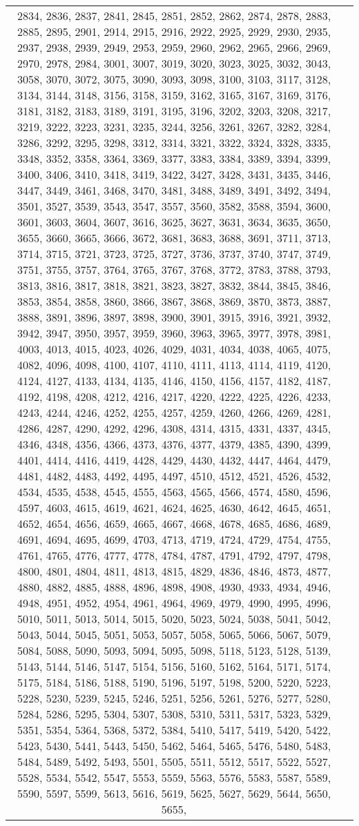 \documentclass[12pt]{article}
\begin{document}
\begin{tabular}{|c|p{15cm}|}
2834, 2836, 2837, 2841, 2845, 2851, 2852, 2862, 2874, 2878, 2883, 2885, 2895, 2901, 2914, 2915, 2916, 2922, 2925, 2929, 2930, 2935, 2937, 2938, 2939, 2949, 2953, 2959, 2960, 2962, 2965, 2966, 2969, 2970, 2978, 2984, 3001, 3007, 3019, 3020, 3023, 3025, 3032, 3043, 3058, 3070, 3072, 3075, 3090, 3093, 3098, 3100, 3103, 3117, 3128, 3134, 3144, 3148, 3156, 3158, 3159, 3162, 3165, 3167, 3169, 3176, 3181, 3182, 3183, 3189, 3191, 3195, 3196, 3202, 3203, 3208, 3217, 3219, 3222, 3223, 3231, 3235, 3244, 3256, 3261, 3267, 3282, 3284, 3286, 3292, 3295, 3298, 3312, 3314, 3321, 3322, 3324, 3328, 3335, 3348, 3352, 3358, 3364, 3369, 3377, 3383, 3384, 3389, 3394, 3399, 3400, 3406, 3410, 3418, 3419, 3422, 3427, 3428, 3431, 3435, 3446, 3447, 3449, 3461, 3468, 3470, 3481, 3488, 3489, 3491, 3492, 3494, 3501, 3527, 3539, 3543, 3547, 3557, 3560, 3582, 3588, 3594, 3600, 3601, 3603, 3604, 3607, 3616, 3625, 3627, 3631, 3634, 3635, 3650, 3655, 3660, 3665, 3666, 3672, 3681, 3683, 3688, 3691, 3711, 3713, 3714, 3715, 3721, 3723, 3725, 3727, 3736, 3737, 3740, 3747, 3749, 3751, 3755, 3757, 3764, 3765, 3767, 3768, 3772, 3783, 3788, 3793, 3813, 3816, 3817, 3818, 3821, 3823, 3827, 3832, 3844, 3845, 3846, 3853, 3854, 3858, 3860, 3866, 3867, 3868, 3869, 3870, 3873, 3887, 3888, 3891, 3896, 3897, 3898, 3900, 3901, 3915, 3916, 3921, 3932, 3942, 3947, 3950, 3957, 3959, 3960, 3963, 3965, 3977, 3978, 3981, 4003, 4013, 4015, 4023, 4026, 4029, 4031, 4034, 4038, 4065, 4075, 4082, 4096, 4098, 4100, 4107, 4110, 4111, 4113, 4114, 4119, 4120, 4124, 4127, 4133, 4134, 4135, 4146, 4150, 4156, 4157, 4182, 4187, 4192, 4198, 4208, 4212, 4216, 4217, 4220, 4222, 4225, 4226, 4233, 4243, 4244, 4246, 4252, 4255, 4257, 4259, 4260, 4266, 4269, 4281, 4286, 4287, 4290, 4292, 4296, 4308, 4314, 4315, 4331, 4337, 4345, 4346, 4348, 4356, 4366, 4373, 4376, 4377, 4379, 4385, 4390, 4399, 4401, 4414, 4416, 4419, 4428, 4429, 4430, 4432, 4447, 4464, 4479, 4481, 4482, 4483, 4492, 4495, 4497, 4510, 4512, 4521, 4526, 4532, 4534, 4535, 4538, 4545, 4555, 4563, 4565, 4566, 4574, 4580, 4596, 4597, 4603, 4615, 4619, 4621, 4624, 4625, 4630, 4642, 4645, 4651, 4652, 4654, 4656, 4659, 4665, 4667, 4668, 4678, 4685, 4686, 4689, 4691, 4694, 4695, 4699, 4703, 4713, 4719, 4724, 4729, 4754, 4755, 4761, 4765, 4776, 4777, 4778, 4784, 4787, 4791, 4792, 4797, 4798, 4800, 4801, 4804, 4811, 4813, 4815, 4829, 4836, 4846, 4873, 4877, 4880, 4882, 4885, 4888, 4896, 4898, 4908, 4930, 4933, 4934, 4946, 4948, 4951, 4952, 4954, 4961, 4964, 4969, 4979, 4990, 4995, 4996, 5010, 5011, 5013, 5014, 5015, 5020, 5023, 5024, 5038, 5041, 5042, 5043, 5044, 5045, 5051, 5053, 5057, 5058, 5065, 5066, 5067, 5079, 5084, 5088, 5090, 5093, 5094, 5095, 5098, 5118, 5123, 5128, 5139, 5143, 5144, 5146, 5147, 5154, 5156, 5160, 5162, 5164, 5171, 5174, 5175, 5184, 5186, 5188, 5190, 5196, 5197, 5198, 5200, 5220, 5223, 5228, 5230, 5239, 5245, 5246, 5251, 5256, 5261, 5276, 5277, 5280, 5284, 5286, 5295, 5304, 5307, 5308, 5310, 5311, 5317, 5323, 5329, 5351, 5354, 5364, 5368, 5372, 5384, 5410, 5417, 5419, 5420, 5422, 5423, 5430, 5441, 5443, 5450, 5462, 5464, 5465, 5476, 5480, 5483, 5484, 5489, 5492, 5493, 5501, 5505, 5511, 5512, 5517, 5522, 5527, 5528, 5534, 5542, 5547, 5553, 5559, 5563, 5576, 5583, 5587, 5589, 5590, 5597, 5599, 5613, 5616, 5619, 5625, 5627, 5629, 5644, 5650, 5655, 
\end{tabular}
\end{document}
